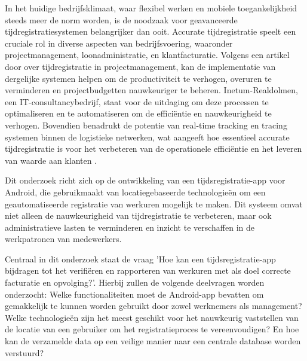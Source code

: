 In het huidige bedrijfsklimaat, waar flexibel werken en mobiele toegankelijkheid steeds meer de norm worden, is de noodzaak voor geavanceerde tijdregistratiesystemen belangrijker dan ooit. Accurate tijdregistratie speelt een cruciale rol in diverse aspecten van bedrijfsvoering, waaronder projectmanagement, loonadministratie, en klantfacturatie. Volgens een artikel door \textcite{Gupta2023} over tijdregistratie in projectmanagement, kan de implementatie van dergelijke systemen helpen om de productiviteit te verhogen, overuren te verminderen en projectbudgetten nauwkeuriger te beheren. Inetum-Realdolmen, een IT-consultancybedrijf, staat voor de uitdaging om deze processen te optimaliseren en te automatiseren om de efficiëntie en nauwkeurigheid te verhogen. Bovendien benadrukt de potentie van real-time tracking en tracing systemen binnen de logistieke netwerken, wat aangeeft hoe essentieel accurate tijdregistratie is voor het verbeteren van de operationele efficiëntie en het leveren van waarde aan klanten \autocite{TrackingAndTracingSystems}.

Dit onderzoek richt zich op de ontwikkeling van een tijdsregistratie-app voor Android, die gebruikmaakt van locatiegebaseerde technologieën om een geautomatiseerde registratie van werkuren mogelijk te maken. Dit systeem omvat niet alleen de nauwkeurigheid van tijdregistratie te verbeteren, maar ook administratieve lasten te verminderen en inzicht te verschaffen in de werkpatronen van medewerkers.

Centraal in dit onderzoek staat de vraag 'Hoe kan een tijdsregistratie-app bijdragen tot het verifiëren en rapporteren van werkuren met als doel correcte facturatie en opvolging?'. Hierbij zullen de volgende deelvragen worden onderzocht: Welke functionaliteiten moet de Android-app bevatten om gemakkelijk te kunnen worden gebruikt door zowel werknemers als management? Welke technologieën zijn het meest geschikt voor het nauwkeurig vaststellen van de locatie van een gebruiker om het registratieproces te vereenvoudigen? En hoe kan de verzamelde data op een veilige manier naar een centrale database worden verstuurd?

